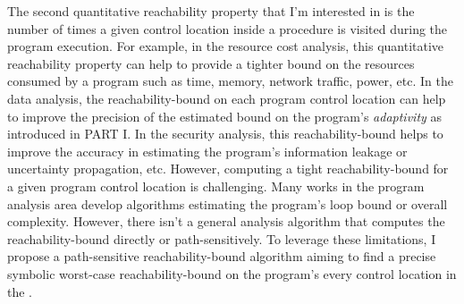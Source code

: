 The second quantitative reachability property that I'm interested in is 
the number of times a given control location 
 inside a procedure is visited during the program execution.
For example, in the resource cost analysis, this quantitative reachability property
can help to provide a tighter
bound on the resources consumed by a program such as time, memory,
network traffic, power, etc.
In the data analysis,
the reachability-bound on each program control location
can help to improve the precision of the estimated bound on the program's \emph{adaptivity} as introduced in PART I.
In the security analysis, this reachability-bound helps to improve the accuracy
in estimating the program's information leakage or uncertainty propagation, etc.
However, computing a tight reachability-bound for a given program control location is challenging.
Many works in the program analysis area develop algorithms estimating the program's loop bound or overall complexity.
However, there isn't a general analysis algorithm that
computes the reachability-bound
directly or path-sensitively.
To leverage these limitations,
I propose a path-sensitive reachability-bound algorithm
aiming to find a precise symbolic worst-case reachability-bound on the program's every control location
in the .

